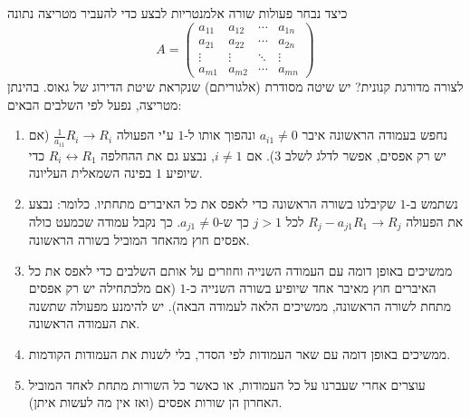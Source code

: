 \documentclass[12pt]{report}
\theoremstyle{plain}
\theoremstyle{definition}
\newcommand{\0}{\mathbf{0}}
\begin{document}
כיצד נבחר פעולות שורה אלמנטריות לבצע כדי להעביר מטריצה
נתונה
$$
A=\begin{pmatrix}a_{11} & a_{12} & \cdots & a_{1n}\\
a_{21} & a_{22} & \cdots & a_{2n}\\
\vdots & \vdots & \ddots & \vdots\\
a_{m1} & a_{m2} & \cdots & a_{mn}
\end{pmatrix}
$$
לצורה מדורגת קנונית? יש שיטה מסודרת (אלגוריתם)
שנקראת שיטת הדירוג של גאוס. בהינתן מטריצה, נפעל לפי השלבים הבאים:
\begin{enumerate}[label=\alph*.]
\item 
נחפש בעמודה הראשונה איבר
$a_{i1}\neq0$
ונהפוך אותו ל-$1$ ע"י הפעולה
$\frac{1}{a_{i1}}R_{i}\to R_{i}$
(אם יש רק אפסים, אפשר לדלג לשלב $3$). אם
$i\neq1$,
נבצע גם את ההחלפה
$R_{i}\leftrightarrow R_1$
כדי שיופיע $1$
בפינה השמאלית העליונה.

\item
 נשתמש ב-$1$ שקיבלנו בשורה הראשונה כדי לאפס
את כל האיברים מתחתיו. כלומר: 
נבצע את הפעולה $R_{j}-a_{j1}R_1\to R_{j}$ לכל $j>1$ כך
ש-$a_{j1}\neq0$. כך נקבל עמודה שכמעט כולה אפסים חוץ מהאחד המוביל
בשורה הראשונה.

\item
 ממשיכים באופן דומה עם העמודה השנייה וחוזרים על אותם השלבים כדי לאפס את כל האיברים חוץ מאיבר אחד שיופיע בשורה השנייה כ-$1$ (אם מלכתחילה יש רק אפסים מתחת לשורה הראשונה, ממשיכים הלאה לעמודה הבאה). יש להימנע מפעולה שתשנה את העמודה הראשונה.

\item
 ממשיכים באופן דומה עם שאר העמודות לפי הסדר, בלי לשנות את העמודות הקודמות.

\item
 עוצרים אחרי שעברנו על כל העמודות, או כאשר כל השורות מתחת לאחד המוביל האחרון הן שורות אפסים (ואז אין מה לעשות איתן).
\end{enumerate}
\end{document}
